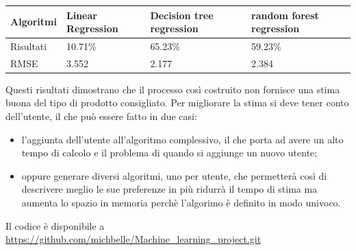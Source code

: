 \documentclass{article}
\begin{document}
\begin{tabular}{|p{}|p{}|p{}|p{}|}
\hline
Algoritmi &Linear Regression          & Decision tree regression         &random forest regression      \\
\hline
Risultati & 10.71\%           & 65.23\%    & 59.23\%          \\
\hline
RMSE &3.552 &2.177 &2.384\\
\hline
\end{tabular}

Questi risultati dimostrano che il processo così costruito non fornisce una stima buona del tipo di prodotto consigliato. Per migliorare la stima si deve tener conto dell'utente, il che può essere fatto in due casi:
\begin{itemize}
\item l'aggiunta dell'utente all'algoritmo complessivo, il che porta ad avere un alto tempo di calcolo e il problema  di quando si aggiunge un nuovo utente;
\item oppure generare diversi algoritmi, uno per utente, che permetterà così di descrivere meglio le sue preferenze in più ridurrà il tempo di stima ma aumenta lo spazio in memoria perchè l'algorimo è definito in modo univoco.
\end{itemize}
Il codice è disponibile a \url{https://github.com/michbelle/Machine_learning_project.git}
\end{document}
